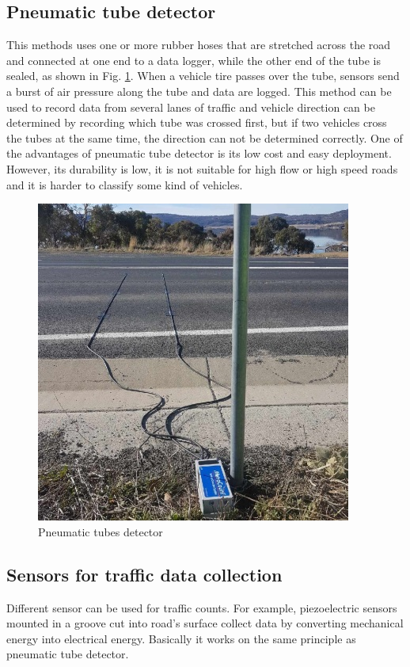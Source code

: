 \documentclass[twoside]{ctuthesis}
\theoremstyle{plain}
\theoremstyle{definition}
\theoremstyle{note}
\begin{document}
\subsection{Pneumatic tube detector}
This methods uses one or more rubber hoses that are stretched  across the road and connected at one end to a data logger, while the other end of the tube is sealed, as shown in Fig. \ref{pneumatic_tubes}. When a vehicle tire passes over the tube, sensors send a burst of air pressure along the tube and data are logged. This method can be used to record data from several lanes of traffic and vehicle direction can be determined by recording which tube was crossed first, but if two vehicles cross the tubes at the same time, the direction can not be determined correctly. One of the advantages of pneumatic tube detector is its low cost and easy deployment. However, its durability is low, it is not suitable for high flow or high speed roads and it is harder to classify some kind of vehicles\cite{point}.
\begin{figure}[h]
\caption{Pneumatic tubes detector\cite{pneu_tubes}}
\label{pneumatic_tubes}
\includegraphics[width=.8\textwidth]{images/introduction/pneutubes.jpeg}
\end{figure}
\subsection{Sensors for traffic data collection}
Different sensor can be used for traffic counts. For example, piezoelectric sensors mounted in a groove cut into road's surface collect data by converting mechanical energy into electrical energy\cite{windmillsoftware2018}.
 Basically it works on the same principle as pneumatic tube detector.
 
\end{document}
